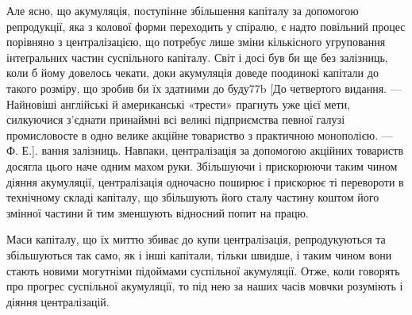 Але ясно, що акумуляція, поступінне збільшення капіталу
за допомогою репродукції, яка з колової форми переходить у
спіралю, є надто повільний процес порівняно з централізацією,
що потребує лише зміни кількісного угруповання інтеґральних
частин суспільного капіталу. Світ і досі був би ще без залізниць,
коли б йому довелось чекати, доки акумуляція доведе поодинокі
капітали до такого розміру, що зробив би їх здатними до буду77b
[До четвертого видання. — Найновіші англійські й американські
«трести» прагнуть уже цієї мети, силкуючися з’єднати принаймні всі
великі підприємства певної галузі промисловосте в одно велике акційне
товариство з практичною монополією. — Ф. Е.].
вання залізниць. Навпаки, централізація за допомогою акційних
товариств досягла цього наче одним махом руки. Збільшуючи
і прискорюючи таким чином діяння акумуляції, централізація
одночасно поширює і прискорює ті перевороти в технічному
складі капіталу, що збільшують його сталу частину коштом його
змінної частини й тим зменшують відносний попит на працю.

Маси капіталу, що їх миттю збиває до купи централізація,
репродукуються та збільшуються так само, як і інші капітали,
тільки швидше, і таким чином вони стають новими могутніми
підоймами суспільної акумуляції. Отже, коли говорять про прогрес
суспільної акумуляції, то під нею за наших часів мовчки
розуміють і діяння централізацій.

